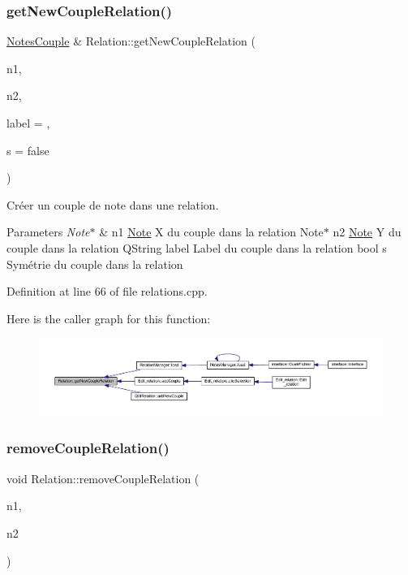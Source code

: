 \subsubsection{\texorpdfstring{get\+New\+Couple\+Relation()}{getNewCoupleRelation()}}
{\footnotesize\ttfamily \hyperlink{class_notes_couple}{Notes\+Couple} \& Relation\+::get\+New\+Couple\+Relation (\begin{DoxyParamCaption}\item[{\hyperlink{class_note}{Note} $\ast$}]{n1,  }\item[{\hyperlink{class_note}{Note} $\ast$}]{n2,  }\item[{Q\+String}]{label = {},  }\item[{bool}]{s = {\ttfamily false} }\end{DoxyParamCaption})}



Créer un couple de note dans une relation. 


\begin{DoxyParams}{Parameters}
{\em Note$\ast$} & n1 \hyperlink{class_note}{Note} X du couple dans la relation Note$\ast$ n2 \hyperlink{class_note}{Note} Y du couple dans la relation Q\+String label Label du couple dans la relation bool s Symétrie du couple dans la relation \\
\hline
\end{DoxyParams}


Definition at line 66 of file relations.\+cpp.

Here is the caller graph for this function\+:\nopagebreak
\begin{figure}[H]
\begin{center}
\leavevmode
\includegraphics[width=350pt]{class_relation_a69211cc18aed20c1df97c4b73317a2e1_icgraph}
\end{center}
\end{figure}
\mbox{\label{class_relation_ab81e16d688dcb4703e8ab299fef80c10}} 
\subsubsection{\texorpdfstring{remove\+Couple\+Relation()}{removeCoupleRelation()}}
{\footnotesize\ttfamily void Relation\+::remove\+Couple\+Relation (\begin{DoxyParamCaption}\item[{\hyperlink{class_note}{Note} $\ast$}]{n1,  }\item[{\hyperlink{class_note}{Note} $\ast$}]{n2 }\end{DoxyParamCaption})}



